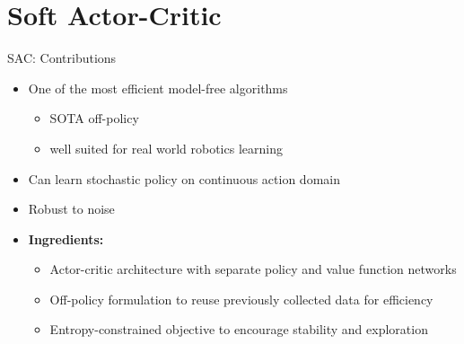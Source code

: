 \section{Soft Actor-Critic}
\begin{frame}{SAC: Contributions}
\begin{itemize}
    \item One of the most efficient model-free algorithms
    \begin{itemize}
        \item SOTA off-policy
        \item well suited for real world robotics learning
    \end{itemize}
    \item Can learn stochastic policy on continuous action domain
    \item Robust to noise
    \vspace{0.5em}
    \item \textbf{Ingredients:}
    \begin{itemize}
        \item Actor-critic architecture with separate policy and value function networks
        \item Off-policy formulation to reuse previously collected data for efficiency
        \item Entropy-constrained objective to encourage stability and exploration
    \end{itemize}
\end{itemize}
\end{frame}
